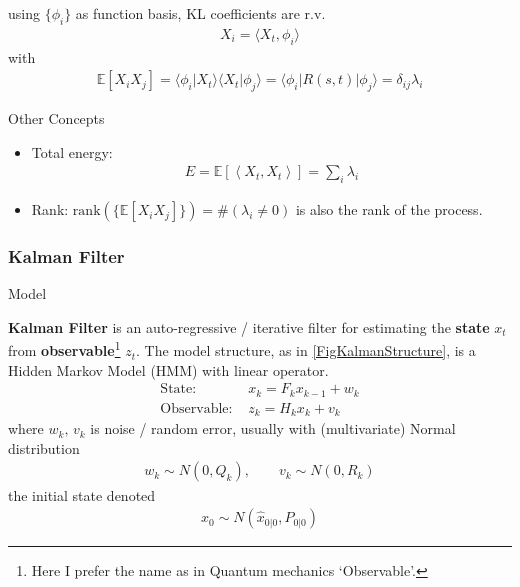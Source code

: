 using $ \{\phi _i\} $ as function basis, KL coefficients are r.v. 
\begin{align}
    X_i=\langle X_t, \phi _i\rangle  
\end{align}
with
\begin{align}
    \mathbb{E}\left[ X_iX_j \right] = \langle \phi_i | X_t\rangle \langle X_t| \phi_j\rangle =  \langle \phi_i | R(s,t) | \phi_j\rangle = \delta _{ij}\lambda _i
\end{align}

\begin{point}
Other Concepts
\end{point}
\begin{itemize}[topsep=2pt,itemsep=0pt]
    \item Total energy:
    \begin{align}
        E=\mathbb{E}\left[ \left\langle X_t,X_t \right\rangle \right]=\sum_i\lambda _i
    \end{align}
    \item Rank: $ \mathrm{rank}\left(\{\mathbb{E}\left[ X_iX_j \right] \}\right) = \#(\lambda _i\neq 0) $ is also the rank of the process.
    
\end{itemize}

    














\subsubsection{Kalman Filter}
\begin{point}
    Model
\end{point}

    \textbf{Kalman Filter} is an auto-regressive / iterative filter for estimating the \textbf{state} $ x_t $ from \textbf{observable}\footnote{Here I prefer the name as in Quantum mechanics `Observable'.} $ z_t $. The model structure, as in \autoref{FigKalmanStructure}, is a Hidden Markov Model (HMM) with linear operator.
    \begin{align}
        \text{State: }&x_{k}=F_{k}x_{k-1}+w_{k} \\
        \text{Observable: }&z_{k}=H_kx_k+v_k
    \end{align}  
    where $ w_k,\,v_k $ is noise / random error, usually with (multivariate) Normal distribution
    \begin{align}
        w_k\sim N(0,Q_k),\qquad v_k\sim N(0,R_k) 
    \end{align}
    the initial state denoted
    \begin{align}
        x_0\sim N(\hat{x}_{0|0}, P _{0|0}) 
    \end{align}

